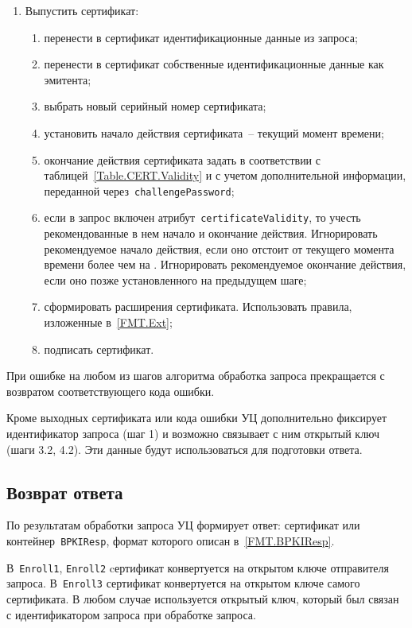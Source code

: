 \begin{enumerate}
\item
Выпустить сертификат:
\begin{enumerate}
\item
перенести в сертификат идентификационные данные из запроса;
\item
перенести в сертификат собственные идентификационные данные как эмитента;
\item
выбрать новый серийный номер сертификата;
\item
установить начало действия сертификата~-- текущий момент времени;
\item
окончание действия сертификата задать в соответствии с 
таблицей~\ref{Table.CERT.Validity} и с учетом дополнительной информации,   
переданной через~\texttt{challengePassword};
\item
если в запрос включен атрибут~\texttt{certificateValidity}, 
то учесть рекомендованные в нем начало и окончание действия. 
Игнорировать рекомендуемое начало действия, если оно отстоит от 
текущего момента времени более чем на . 
Игнорировать рекомендуемое окончание действия, если оно позже 
установленного на предыдущем шаге; 
\item
сформировать расширения сертификата. Использовать правила,
изложенные в~\ref{FMT.Ext};
\item
подписать сертификат.
\end{enumerate}
\end{enumerate}

При ошибке на любом из шагов алгоритма обработка запроса 
прекращается с возвратом соответствующего кода ошибки.

Кроме выходных сертификата или кода ошибки 
УЦ дополнительно фиксирует идентификатор запроса (шаг 1)
и возможно связывает с ним открытый ключ (шаги 3.2, 4.2). 
Эти данные будут использоваться для подготовки ответа.


\subsection{Возврат ответа}\label{PROCESSES.Enroll.Resp}

По результатам обработки запроса УЦ формирует ответ: сертификат или 
контейнер~\texttt{BPKIResp}, формат которого описан в~\ref{FMT.BPKIResp}. 

В~\texttt{Enroll1}, \texttt{Enroll2} cертификат конвертуется на открытом 
ключе отправителя запроса. В~\texttt{Enroll3} сертификат конвертуется на 
открытом ключе самого сертификата.
%
В любом случае используется открытый ключ, который был связан с 
идентификатором запроса при обработке запроса.

